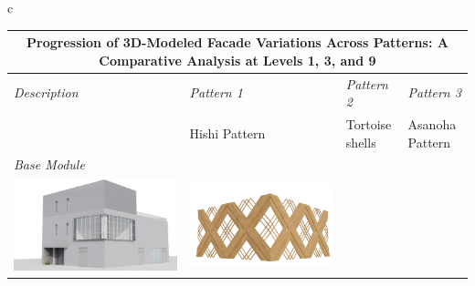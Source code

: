 \begin{linenumbers}
\begin{table}[!htb]
\begin{tabular}{c}
\begin{minipage}{\textwidth}
            \label{tab:PatternsVariationsPart0}
            \begin{tabularx}
            {\textwidth}{p{3cm} >{\centering\arraybackslash}X >{\centering\arraybackslash}X >{\centering\arraybackslash}X }
        \toprule
        \multicolumn{4}{c}{\textbf{Progression of 3D-Modeled Facade Variations Across Patterns: A Comparative Analysis at Levels 1, 3, and 9}}\\
        \toprule
        \textit{Description} &
          \textit{Pattern 1} &
          \textit{Pattern 2} &
          \textit{Pattern 3} \\
        \midrule
        \text{Pattern Name} & Hishi Pattern & Tortoise shells & Asanoha Pattern\\

        \midrule
        \textit{Base Module} &  &  &
        \\
        {\includegraphics[width=1\linewidth]{Images/Base Module/Building}} &
          {\includegraphics[width=1\linewidth]{Images/Base Module/Pattern1}} &

\end{tabularx}
\end{minipage}
\end{tabular}
\end{table}
\end{linenumbers}
